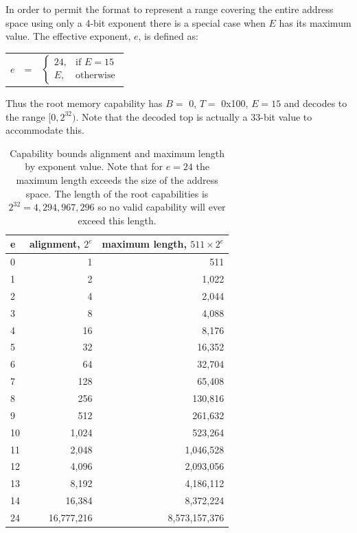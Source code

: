 In order to permit the format to represent a range covering the entire address space using only a 4-bit exponent there is a special case when $E$ has its maximum value.
The effective exponent, $e$, is defined as:

\begin{center}
\begin{tabular}{r c l}
$e$ &=& $ \begin{cases}
              24,& \text{if } E = 15 \\
              E,& \text{otherwise}
\end{cases} $ \\
\end{tabular}
\end{center}

Thus the root memory capability has $B =$ 0, $T =$ 0x100, $E = 15$ and decodes to the range $[0,2^{32})$.
Note that the decoded top is actually a 33-bit value to accommodate this.

\begin{table}
  \centering
  \begin{tabular}{lrr}
  \toprule
  e  &  alignment, $2^e$ &  maximum length, $511 \times 2^e$ \\
  \midrule
  0  &          1 &         511 \\
  1  &          2 &        1,022 \\
  2  &          4 &        2,044 \\
  3  &          8 &        4,088 \\
  4  &         16 &        8,176 \\
  5  &         32 &       16,352 \\
  6  &         64 &       32,704 \\
  7  &        128 &       65,408 \\
  8  &        256 &      130,816 \\
  9  &        512 &      261,632 \\
  10 &       1,024 &      523,264 \\
  11 &       2,048 &     1,046,528 \\
  12 &       4,096 &     2,093,056 \\
  13 &       8,192 &     4,186,112 \\
  14 &      16,384 &     8,372,224 \\
  24 &   16,777,216 &  8,573,157,376 \\
  \bottomrule
  \end{tabular}
  \caption{\label{tab:caplen}
  Capability bounds alignment and maximum length by exponent value.
  Note that for $e=24$ the maximum length exceeds the size of the address space.
  The length of the root capabilities is $2^{32} = 4,294,967,296$ so no valid capability will ever exceed this length.
  }
\end{table}

